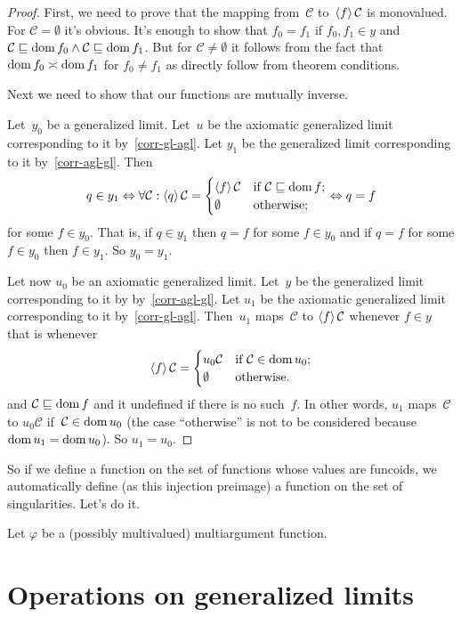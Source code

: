\begin{proof}
First, we need to prove that the mapping from~$\mathcal{C}$ to~$\left\langle f\right\rangle\mathcal{C}$ is monovalued. For $\mathcal{C}=\emptyset$ it's obvious. It's enough to show that $f_0=f_1$ if $f_0,f_1\in y$ and $\mathcal{C}\sqsubseteq\operatorname{dom} f_0\land\mathcal{C}\sqsubseteq\operatorname{dom} f_1$. But for $\mathcal{C}\ne\emptyset$ it follows from the fact that $\operatorname{dom} f_0\asymp\operatorname{dom} f_1$ for $f_0\ne f_1$ as directly follow from theorem conditions.

Next we need to show that our functions are mutually inverse.

Let~$y_0$ be a generalized limit. Let~$u$ be the axiomatic generalized limit corresponding to it by~\ref{corr-gl-agl}. Let $y_1$ be the generalized limit corresponding to it by~\ref{corr-agl-gl}. Then
\[q\in y_1 \Leftrightarrow \forall\mathcal{C}:\left\langle q\right\rangle\mathcal{C}=\begin{cases}
\left\langle f\right\rangle\mathcal{C}&\text{if }\mathcal{C}\sqsubseteq\operatorname{dom} f;\\
\emptyset&\text{otherwise};
\end{cases} \Leftrightarrow q=f
\]
for some $f\in y_0$. That is, if $q\in y_1$ then $q=f$ for some $f\in y_0$ and if $q=f$ for some $f\in y_0$ then $f\in y_1$. So $y_0=y_1$.

Let now $u_0$ be an axiomatic generalized limit. Let~$y$ be the generalized limit corresponding to it by by~\ref{corr-agl-gl}. Let $u_1$ be the axiomatic generalized limit corresponding to it by~\ref{corr-gl-agl}. Then~$u_1$ maps~$\mathcal{C}$ to $\left\langle f\right\rangle\mathcal{C}$ whenever $f\in y$ that is whenever
\[\left\langle f\right\rangle\mathcal{C}=\begin{cases}
u_0\mathcal{C}&\text{if }\mathcal{C}\in\operatorname{dom} u_0;\\
\emptyset&\text{otherwise}.
\end{cases}
\] and $\mathcal{C}\sqsubseteq\operatorname{dom} f$ and it undefined if there is no such~$f$.
In other words, $u_1$ maps~$\mathcal{C}$ to $u_0\mathcal{C}$ if~$\mathcal{C}\in\operatorname{dom} u_0$ (the case ``otherwise'' is not to be considered because $\operatorname{dom} u_1=\operatorname{dom} u_0$). So $u_1=u_0$.
\end{proof}

So if we define a function on the set of functions whose values are funcoids, we automatically define (as this injection preimage) a function on the set of singularities. Let's do it.

Let $\varphi$ be a (possibly multivalued) multiargument function.

\chapter{Operations on generalized limits}

